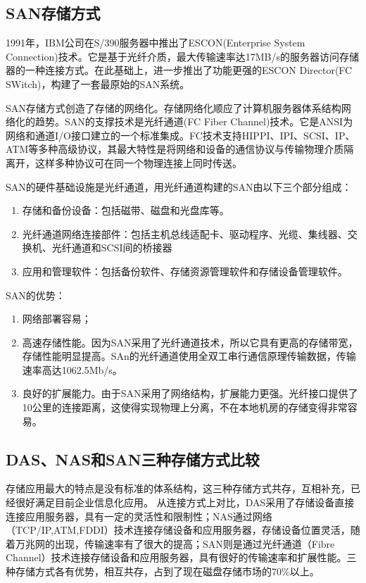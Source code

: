 \subsection{SAN存储方式}
1991年，IBM公司在S/390服务器中推出了ESCON(Enterprise System Connection)技术。它是基于光纤介质，最大传输速率达17MB/s的服务器访问存储器的一种连接方式。在此基础上，进一步推出了功能更强的ESCON Director(FC SWitch)，构建了一套最原始的SAN系统。

SAN存储方式创造了存储的网络化。存储网络化顺应了计算机服务器体系结构网络化的趋势。SAN的支撑技术是光纤通道(FC Fiber Channel)技术。它是ANSI为网络和通道I/O接口建立的一个标准集成。FC技术支持HIPPI、IPI、SCSI、IP、ATM等多种高级协议，其最大特性是将网络和设备的通信协议与传输物理介质隔离开，这样多种协议可在同一个物理连接上同时传送。

SAN的硬件基础设施是光纤通道，用光纤通道构建的SAN由以下三个部分组成：
\begin{enumerate}
\item 存储和备份设备：包括磁带、磁盘和光盘库等。
\item 光纤通道网络连接部件：包括主机总线适配卡、驱动程序、光缆、集线器、交换机、光纤通道和SCSI间的桥接器
\item 应用和管理软件：包括备份软件、存储资源管理软件和存储设备管理软件。
\end{enumerate}

SAN的优势：
\begin{enumerate}
\item 网络部署容易；
\item 高速存储性能。因为SAN采用了光纤通道技术，所以它具有更高的存储带宽，存储性能明显提高。SAn的光纤通道使用全双工串行通信原理传输数据，传输速率高达1062.5Mb/s。
\item 良好的扩展能力。由于SAN采用了网络结构，扩展能力更强。光纤接口提供了10公里的连接距离，这使得实现物理上分离，不在本地机房的存储变得非常容易。
\end{enumerate}
\subsection{DAS、NAS和SAN三种存储方式比较}
存储应用最大的特点是没有标准的体系结构，这三种存储方式共存，互相补充，已经很好满足目前企业信息化应用。
从连接方式上对比，DAS采用了存储设备直接连接应用服务器，具有一定的灵活性和限制性；NAS通过网络（TCP/IP,ATM,FDDI）技术连接存储设备和应用服务器，存储设备位置灵活，随着万兆网的出现，传输速率有了很大的提高；SAN则是通过光纤通道（Fibre Channel）技术连接存储设备和应用服务器，具有很好的传输速率和扩展性能。三种存储方式各有优势，相互共存，占到了现在磁盘存储市场的70\%以上。

